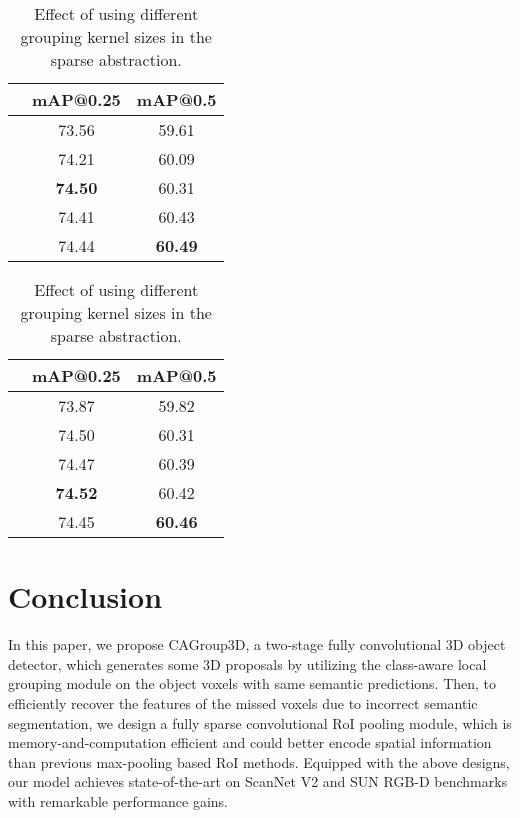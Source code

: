 \documentclass{article}
\begin{document}
\begin{table}[t]
  \begin{minipage}[b]{0.5\linewidth}
  	\caption{Effect of different proposal sampling resolution  in the  sparse abstraction.}
  	\label{tab:partsize_ab}
  	\centering
  	\begin{tabular}{ccc}
    	\toprule
    	 & mAP@0.25 & mAP@0.5\\
    	\midrule
    			    & 73.56        & 59.61      \\
    			    & 74.21        & 60.09      \\
    			    & \textbf{74.50}        & 60.31      \\
    			    & 74.41        & 60.43      \\
    			    & 74.44        & \textbf{60.49}      \\
	
    	\bottomrule
  	\end{tabular}
  \end{minipage}
  \hspace{20pt}
  \begin{minipage}[b]{0.45\linewidth}
  	\caption{Effect of using different grouping kernel sizes  in the  sparse abstraction.}
  	\label{tab:pk_ab}
  	\centering
  	\begin{tabular}{ccc}
    	\toprule
    	  & mAP@0.25 & mAP@0.5 \\
    	\midrule
    			    & 73.87        & 59.82      \\
    			    & 74.50        & 60.31      \\
    			    & 74.47        & 60.39      \\
    			    & \textbf{74.52}        & 60.42      \\
    			& 74.45        & \textbf{60.46}      \\
	
    	\bottomrule
  	\end{tabular}
  \end{minipage}
\end{table}

\section{Conclusion}\label{sec:conclusion}
In this paper, we propose CAGroup3D, a two-stage fully convolutional 3D object detector, which generates some 3D proposals by utilizing the class-aware local grouping module on the object voxels with same semantic predictions. Then, to efficiently recover the features of the missed voxels due to incorrect semantic segmentation, we design a fully sparse convolutional RoI pooling module, which is memory-and-computation efficient and could better encode spatial information than previous max-pooling based RoI methods. Equipped with the above designs, our model achieves state-of-the-art on ScanNet V2 and SUN RGB-D benchmarks with remarkable performance gains.
\end{document}
